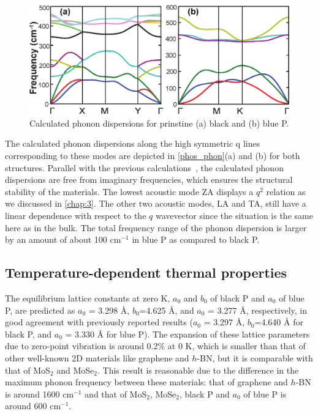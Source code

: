 \begin{figure}[htbp]
\centering
\includegraphics[width=0.8\linewidth]{phos_phon.eps}%
\caption{Calculated phonon dispersions for prinstine (a) black and (b) blue P.\label{phos_phon}}
\end{figure}

The calculated phonon dispersions along the high symmetric q lines corresponding to these modes are depicted in \autoref{phos_phon}(a) and (b) for both structures. Parallel with the previous calculations~\cite{phonon-blackP,phonon-blackP-1}, the calculated phonon dispersions are free from imaginary frequencies, which ensures the structural stability of the materials. The lowest acoustic mode ZA displays a $q^2$ relation as we discussed in \autoref{chap:3}.  The other two acoustic modes, LA and TA, still have a linear dependence with respect to the $q$ wavevector since the situation is the same here as in the bulk. The total frequency range of the phonon dispersion is larger by an amount of about 100 cm$^{-1}$ in blue P as compared to black P. 

\subsection{Temperature-dependent thermal properties}

The equilibrium lattice constants at zero K, $a_0$ and $b_0$ of black P and $a_0$ of blue P, are predicted as $a_0$ = 3.298 {\AA}, $b_0$=4.625 {\AA}, and  $a_0$ = 3.277 {\AA}, respectively,  in  good agreement with previously reported results ($a_0$ = 3.297 {\AA}, $b_0$=4.640 {\AA} for black P\cite{fei,deniz3}, and  $a_0$ = 3.330 {\AA} for blue P\cite{Zhu2014}). 
The expansion of these lattice parameters due to zero-point vibration is around 0.2\% at 0 K, which is smaller than that of other well-known 2D materials like graphene and $h$-BN, but it is comparable with that of MoS$_2$ and MoSe$_2$. This result is reasonable due to the difference in the maximum phonon frequency between these materials: that of graphene and $h$-BN is around 1600 cm$^{-1}$ and that of MoS$_2$, MoSe$_2$, black P and $a_0$ of blue P is around 600 cm$^{-1}$. 

